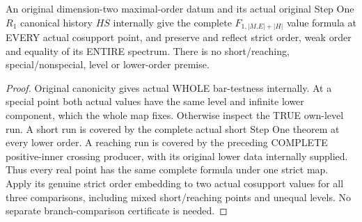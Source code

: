 \begin{theorem}
\label{hir:original-entire-step-one-curve-history-value-order}
\leanok
An original dimension-two maximal-order datum and its actual original
Step One $R_1$ canonical history $HS$ internally give the complete
$F_{1,|M.E|+|H|}$ value formula at EVERY actual cosupport point, and preserve
and reflect strict order, weak order and equality of its ENTIRE spectrum.
There is no short/reaching, special/nonspecial, level or lower-order premise.
\end{theorem}
\begin{proof}
Original canonicity gives actual WHOLE bar-testness internally. At a special
point both actual values have the same level and infinite lower component,
which the whole map fixes. Otherwise inspect the TRUE own-level run. A short
run is covered by the complete actual short Step One theorem at every lower
order. A reaching run is covered by the preceding COMPLETE positive-inner
crossing producer, with its original lower data internally supplied. Thus
every real point has the same complete formula under one strict map.
Apply its genuine strict order embedding to two actual cosupport values
for all three comparisons, including mixed short/reaching points and
unequal levels. No separate branch-comparison certificate is needed.
\end{proof}

